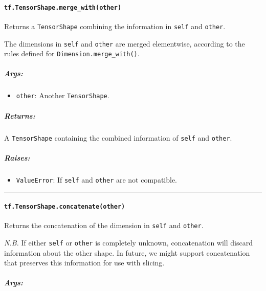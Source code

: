 \paragraph{\texorpdfstring{\lstinline{tf.TensorShape.merge_with(other)}
}{tf.TensorShape.merge_with(other) }}\label{tf.tensorshape.mergeux5fwithother}

Returns a \lstinline{TensorShape} combining the information in
\lstinline{self} and \lstinline{other}.

The dimensions in \lstinline{self} and \lstinline{other} are merged
elementwise, according to the rules defined for
\lstinline{Dimension.merge_with()}.

\subparagraph{Args: }\label{args-30}

\begin{itemize}
\tightlist
\item
  \lstinline{other}: Another \lstinline{TensorShape}.
\end{itemize}

\subparagraph{Returns: }\label{returns-31}

A \lstinline{TensorShape} containing the combined information of
\lstinline{self} and \lstinline{other}.

\subparagraph{Raises: }\label{raises-17}

\begin{itemize}
\tightlist
\item
  \lstinline{ValueError}: If \lstinline{self} and \lstinline{other} are not
  compatible.
\end{itemize}

\begin{center}\rule{0.5\linewidth}{\linethickness}\end{center}

\paragraph{\texorpdfstring{\lstinline{tf.TensorShape.concatenate(other)}
}{tf.TensorShape.concatenate(other) }}\label{tf.tensorshape.concatenateother}

Returns the concatenation of the dimension in \lstinline{self} and
\lstinline{other}.

\emph{N.B.} If either \lstinline{self} or \lstinline{other} is completely
unknown, concatenation will discard information about the other shape.
In future, we might support concatenation that preserves this
information for use with slicing.

\subparagraph{Args: }\label{args-31}

